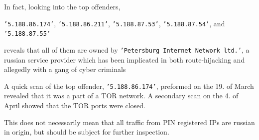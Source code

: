     In fact, looking into the top offenders, 


    \texttt{'5.188.86.174'},
    \texttt{'5.188.86.211'},
    \texttt{'5.188.87.53'},
    \texttt{'5.188.87.54'}, and 
    \texttt{'5.188.87.55'} 

    reveals that all of them 
    are owned by \texttt{'Petersburg 
    Internet Network ltd.'}, a russian service provider 
    which has been implicated in both route-hijacking \cite{bogus_routing} 
    and allegedly with a gang of cyber criminals \cite{petersburg}

    
    A quick scan of the top offender, \texttt{'5.188.86.174'},
    preformed on the 19. of March revealed that it was a part of
    a TOR network. A secondary scan on the 4. of 
    April showed that the TOR ports were closed.

    This does not necessarily mean that all traffic from PIN
    registered IPs are russian in origin, but should be 
    subject for further inspection.